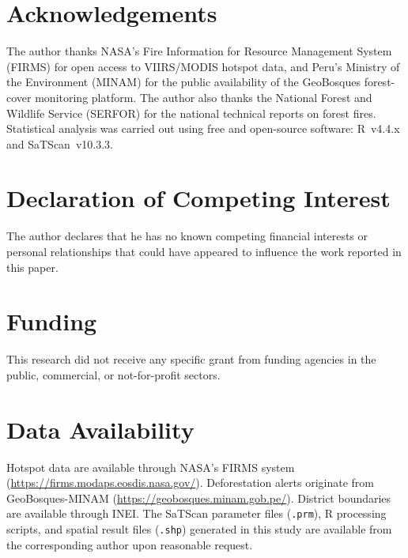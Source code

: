 \documentclass[preprint,12pt,authoryear]{elsarticle}
\begin{document}
	\section*{Acknowledgements}
	
	The author thanks NASA's Fire Information for Resource Management
	System (FIRMS) for open access to VIIRS/MODIS hotspot data, and
	Peru's Ministry of the Environment (MINAM) for the public
	availability of the GeoBosques forest-cover monitoring platform.
	The author also thanks the National Forest and Wildlife Service
	(SERFOR) for the national technical reports on forest fires.
	Statistical analysis was carried out using free and open-source
	software: R~v4.4.x and SaTScan~v10.3.3.
	
	
	
	
	\section*{Declaration of Competing Interest}
	The author declares that he has no known competing financial interests or personal relationships that could have appeared to influence the work reported in this paper.
	
	\section*{Funding}
	This research did not receive any specific grant from funding agencies in the public, commercial, or not-for-profit sectors.
	
	\section*{Data Availability}
	Hotspot data are available through NASA's FIRMS system (\url{https://firms.modaps.eosdis.nasa.gov/}). Deforestation alerts originate from GeoBosques-MINAM (\url{https://geobosques.minam.gob.pe/}). District boundaries are available through INEI. The SaTScan parameter files (\texttt{.prm}), R processing scripts, and spatial result files (\texttt{.shp}) generated in this study are available from the corresponding author upon reasonable request.
	
\end{document}
